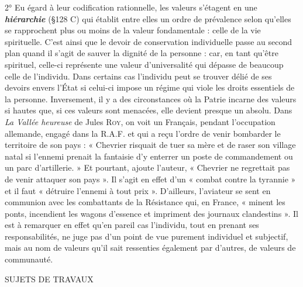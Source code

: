 2° Eu égard à leur codification rationnelle, les valeurs s’étagent en
une \textbf{\textit {hiérarchie}} (\S 128 C) qui établit entre elles un ordre de prévalence
selon qu’elles se rapprochent plus ou moins de la valeur fondamentale :
celle de la vie spirituelle. C’est ainsi que le devoir de conservation
individuelle passe au second plan quand il s’agit de sauver la dignité
de la personne : car, en tant qu'être spirituel, celle-ci représente une
valeur d’universalité qui dépasse de beaucoup celle de l'individu.
Dans certains cas l’individu peut se trouver délié de ses devoirs envers
l’État si celui-ci impose un régime qui viole les droits essentiels de la
personne. Inversement, il y a des circonstances où la Patrie incarne
des valeurs si hautes que, si ces valeurs sont menacées, elle devient
presque un absolu. Dans {\it La Vallée heureuse} de Jules \textsc{Roy}, on voit un
Français, pendant l'occupation allemande, engagé dans la R.A.F.
et qui a reçu l’ordre de venir bombarder le territoire de son pays :
« Chevrier risquait de tuer sa mère et de raser son village natal si
l’ennemi prenait la fantaisie d’y enterrer un poste de commandement
ou un parc d'artillerie. » Et pourtant, ajoute l’auteur, « Chevrier ne
regrettait pas de venir attaquer son pays ». Il s’agit en effet d’un
« combat contre la tyrannie » et il faut « détruire l’ennemi à tout prix ».
D'ailleurs, l’aviateur se sent en communion avec les combattants de
la Résistance qui, en France, « minent les ponts, incendient les wagons
d’essence et impriment des journaux clandestins ». Il est à remarquer
en effet qu’en pareil cas l'individu, tout en prenant ses responsabilités,
ne juge pas d’un point de vue purement individuel et subjectif,
mais au nom de valeurs qu’il sait ressenties également par d’autres,
de valeurs de communauté.

SUJETS DE TRAVAUX

